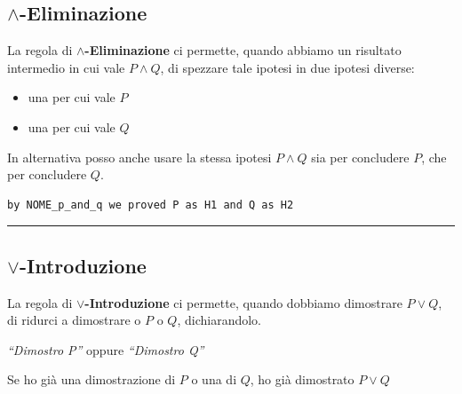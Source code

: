 \documentclass[
  a4paper,
]{article}
\providecommand{\tightlist}{%
  \setlength{\itemsep}{0pt}\setlength{\parskip}{0pt}}
\begin{document}
\hypertarget{land-eliminazione}{%
\subsection{\texorpdfstring{\(\land\)-Eliminazione}{\textbackslash land-Eliminazione}}\label{land-eliminazione}}

La regola di \textbf{\(\land\)-Eliminazione} ci permette, quando abbiamo
un risultato intermedio in cui vale \(P \land Q\), di spezzare tale
ipotesi in due ipotesi diverse:

\begin{itemize}
\tightlist
\item
  una per cui vale \(P\)
\item
  una per cui vale \(Q\)
\end{itemize}

In alternativa posso anche usare la stessa ipotesi \(P \land Q\) sia per
concludere \(P\), che per concludere \(Q\).

\begin{examplebox}

\begin{lstlisting}
by NOME_p_and_q we proved P as H1 and Q as H2
\end{lstlisting}

\end{examplebox}

\par\noindent\rule{\linewidth}{0.4pt}\par\vspace{6pt}

\hypertarget{lor-introduzione}{%
\subsection{\texorpdfstring{\(\lor\)-Introduzione}{\textbackslash lor-Introduzione}}\label{lor-introduzione}}

La regola di \textbf{\(\lor\)-Introduzione} ci permette, quando dobbiamo
dimostrare \(P \lor Q\), di ridurci a dimostrare o \(P\) o \(Q\),
dichiarandolo.

\begin{examplebox}[Esempio]

\emph{``Dimostro P''} oppure \emph{``Dimostro Q''}

\end{examplebox}

Se ho già una dimostrazione di \(P\) o una di \(Q\), ho già dimostrato
\(P \lor Q\)
\end{document}

